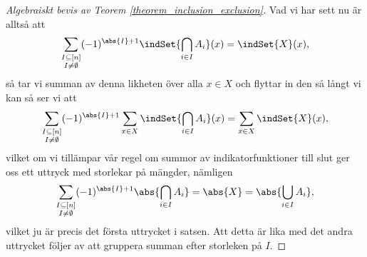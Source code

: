 \documentclass[nobib]{tufte-handout}
\begin{document}
\begin{proof}[Algebraiskt bevis av Teorem \ref{theorem_inclusion_exclusion}]
  Vad vi har sett nu är alltså att
  $$\sum_{\substack{I \subseteq [n]\\I\neq\emptyset}} (-1)^{\abs{I}+1} \indSet{\bigcap_{i\in I} A_i}(x) = \indSet{X}(x),$$
  så tar vi summan av denna likheten över alla $x \in X$ och flyttar in den så långt vi kan så ser vi att
  $$\sum_{\substack{I \subseteq [n]\\I\neq\emptyset}} (-1)^{\abs{I}+1} \sum_{x\in X}\indSet{\bigcap_{i\in I} A_i}(x) = \sum_{x \in X}\indSet{X}(x),$$
  vilket om vi tillämpar vår regel om summor av indikatorfunktioner till slut ger oss ett uttryck med storlekar på mängder, nämligen
  $$\sum_{\substack{I \subseteq [n]\\I\neq\emptyset}} (-1)^{\abs{I}+1} \abs{\bigcap_{i\in I} A_i} = \abs{X} = \abs{\bigcup_{i \in I} A_i},$$
  vilket ju är precis det första uttrycket i satsen. Att detta är lika med det andra uttrycket följer av att gruppera summan efter storleken på $I$.
\end{proof}
\end{document}
